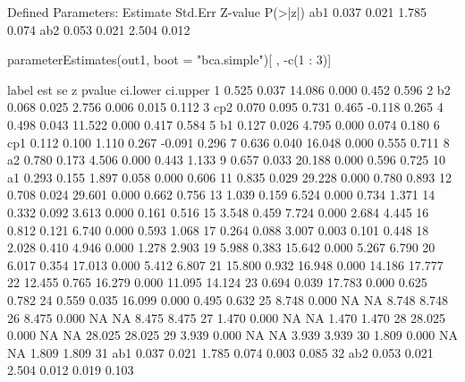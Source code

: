 \begin{Schunk}
\begin{Soutput}
Defined Parameters:
                   Estimate  Std.Err  Z-value  P(>|z|)
    ab1               0.037    0.021    1.785    0.074
    ab2               0.053    0.021    2.504    0.012
\end{Soutput}
\begin{Sinput}
 parameterEstimates(out1, boot = "bca.simple")[ , -c(1 : 3)]
\end{Sinput}
\begin{Soutput}
   label    est    se      z pvalue ci.lower ci.upper
1         0.525 0.037 14.086  0.000    0.452    0.596
2     b2  0.068 0.025  2.756  0.006    0.015    0.112
3    cp2  0.070 0.095  0.731  0.465   -0.118    0.265
4         0.498 0.043 11.522  0.000    0.417    0.584
5     b1  0.127 0.026  4.795  0.000    0.074    0.180
6    cp1  0.112 0.100  1.110  0.267   -0.091    0.296
7         0.636 0.040 16.048  0.000    0.555    0.711
8     a2  0.780 0.173  4.506  0.000    0.443    1.133
9         0.657 0.033 20.188  0.000    0.596    0.725
10    a1  0.293 0.155  1.897  0.058    0.000    0.606
11        0.835 0.029 29.228  0.000    0.780    0.893
12        0.708 0.024 29.601  0.000    0.662    0.756
13        1.039 0.159  6.524  0.000    0.734    1.371
14        0.332 0.092  3.613  0.000    0.161    0.516
15        3.548 0.459  7.724  0.000    2.684    4.445
16        0.812 0.121  6.740  0.000    0.593    1.068
17        0.264 0.088  3.007  0.003    0.101    0.448
18        2.028 0.410  4.946  0.000    1.278    2.903
19        5.988 0.383 15.642  0.000    5.267    6.790
20        6.017 0.354 17.013  0.000    5.412    6.807
21       15.800 0.932 16.948  0.000   14.186   17.777
22       12.455 0.765 16.279  0.000   11.095   14.124
23        0.694 0.039 17.783  0.000    0.625    0.782
24        0.559 0.035 16.099  0.000    0.495    0.632
25        8.748 0.000     NA     NA    8.748    8.748
26        8.475 0.000     NA     NA    8.475    8.475
27        1.470 0.000     NA     NA    1.470    1.470
28       28.025 0.000     NA     NA   28.025   28.025
29        3.939 0.000     NA     NA    3.939    3.939
30        1.809 0.000     NA     NA    1.809    1.809
31   ab1  0.037 0.021  1.785  0.074    0.003    0.085
32   ab2  0.053 0.021  2.504  0.012    0.019    0.103
\end{Soutput}
\end{Schunk}
